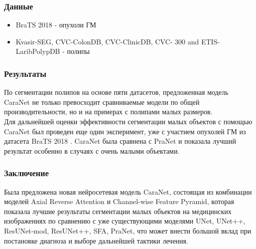 \subsubsection*{Данные}
\begin{itemize}
    \item BraTS 2018 - опухоли ГМ
    \item Kvasir-SEG, CVC-ColonDB, CVC-ClinicDB, CVC-
    300 and ETIS-LaribPolypDB - полипы
\end{itemize}
 
\subsubsection*{Результаты}
По сегментации полипов на основе пяти датасетов, предложенная модель CaraNet не только 
превосходит сравниваемые модели по общей производительности, но и на примерах с полипами 
малых размеров. \\


Для дальнейшей оценки эффективности сегментации малых объектов с помощью CaraNet был 
проведен еще один эксперимент, уже с участием опухолей ГМ из датасета BraTS 2018 \cite{BraTS}. CaraNet 
была сравнена с PraNet \cite{PraNet} и показала лучший результат особенно в случаях с очень малыми объектами. \\

    



\subsubsection*{Заключение}
Была предложена новая нейросетевая модель CaraNet, состоящая из комбинации моделей 
Axial Reverse Attention и Channel-wise Feature Pyramid, которая показала 
лучшие результаты сегментации малых объектов на медицинских изображениях по сравнению с уже существующими моделями 
UNet, UNet++, ResUNet-mod, ResUNet++, SFA, PraNet, что может внести большой вклад 
при постановке диагноза и выборе дальнейшей тактики лечения.